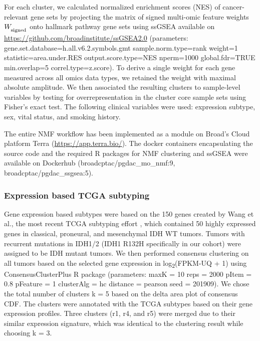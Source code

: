 For each cluster, we calculated normalized enrichment scores (NES) of cancer-relevant gene sets by projecting the matrix of signed multi-omic feature weights $W_\textsubscript{signed}$ onto hallmark pathway gene sets \cite{liberzona_tamayop:MolecularSignatures2015} using ssGSEA \cite{barbieda_hahnwc:SystematicRNA2009} available on \url{https://github.com/broadinstitute/ssGSEA2.0} (parameters: gene.set.database=\textquotedbl{}h.all.v6.2.symbols.gmt\textquotedbl{} sample.norm.type=\textquotedbl{}rank\textquotedbl{} weight=1 statistic=\textquotedbl{}area.under.RES\textquotedbl{} output.score.type=\textquotedbl{}NES\textquotedbl{} nperm=1000 global.fdr=TRUE min.overlap=5 correl.type=\textquotedbl{}z.score\textquotedbl{}). To derive a single weight for each gene measured across all omics data types, we retained the weight with maximal absolute amplitude. We then associated the resulting clusters to sample-level variables by testing for overrepresentation in the cluster core sample sets using Fisher's exact test. The following clinical variables were used: expression subtype, sex, vital status, and smoking history.

The entire NMF workflow has been implemented as a module on Broad's Cloud platform Terra (\url{https://app.terra.bio/}). The docker containers encapsulating the source code and the required R packages for NMF clustering and ssGSEA were available on Dockerhub (broadcptac/pgdac\_mo\_nmf:9, broadcptac/pgdac\_ssgsea:5).


\subsubsection{Expression based TCGA subtyping}
Gene expression based subtypes were based on the 150 genes created by Wang et al., the most recent TCGA subtyping effort \cite{wangq_verhaakrgw:TumorEvolution2017}, which contained 50 highly expressed genes in classical, proneural, and mesenchymal IDH WT tumors. Tumors with recurrent mutations in IDH1/2 (IDH1 R132H specifically in our cohort) were assigned to be IDH mutant tumors. We then performed consensus clustering on all tumors based on the selected gene expression in log\textsubscript{2}(FPKM-UQ + 1) using ConsensusClusterPlus R package (parameters: maxK = 10 reps = 2000 pItem = 0.8 pFeature = 1 clusterAlg = \textquotedbl{}hc\textquotedbl{} distance = \textquotedbl{}pearson\textquotedbl{} seed = 201909). We chose the total number of clusters k = 5 based on the delta area plot of consensus CDF. The clusters were annotated with the TCGA subtypes based on their gene expression profiles. Three clusters (r1, r4, and r5) were merged due to their similar expression signature, which was identical to the clustering result while choosing k = 3.

